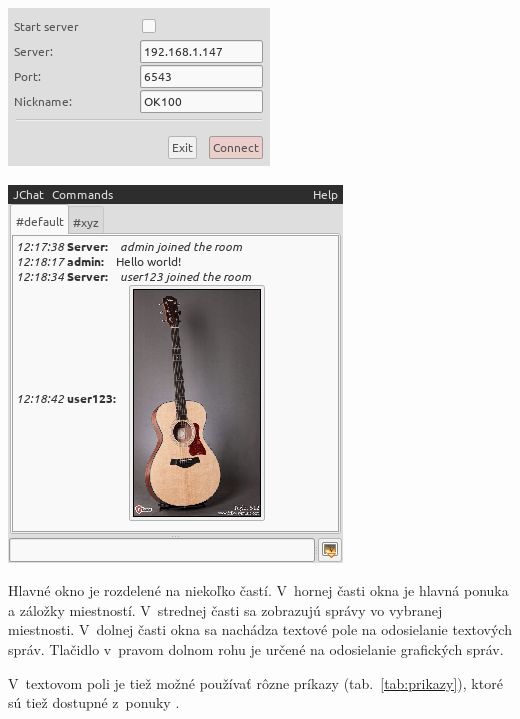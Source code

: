 \documentclass[11pt]{article}
\begin{document}
\begin{centering}
	\includegraphics[scale=0.75]{login.png}
	\label{fig:loginwindow}

	\bigskip

	\includegraphics[scale=0.75]{main.png}
	\label{fig:mainwindow}
\end{centering}

\bigskip

Hlavné okno je rozdelené na niekoľko častí. V~hornej časti okna je hlavná ponuka
a záložky miestností. V~strednej časti sa zobrazujú správy vo vybranej
miestnosti. V~dolnej časti okna sa nachádza textové pole na odosielanie
textových správ. Tlačidlo  v~pravom dolnom rohu je určené
na odosielanie grafických správ.

V~textovom poli je tiež možné používať rôzne príkazy (tab.~\ref{tab:prikazy}),
ktoré sú tiež dostupné z~ponuky .
\end{document}
